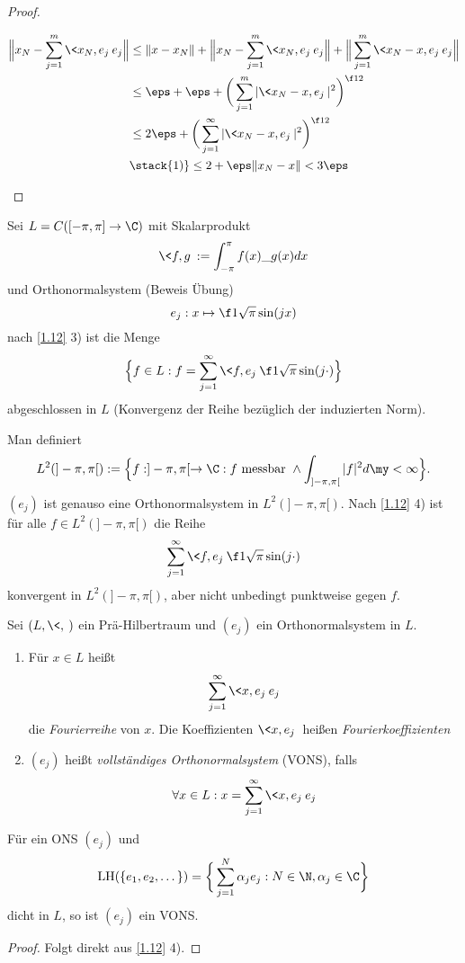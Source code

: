 \documentclass{mycourse}
\newcommand{\LH}{\operatorname{LH}}
\begin{document}
\begin{st}
\begin{proof}
\begin{enumerate}[1)]
\begin{align*}
					\Big\|x_N- \sum_{j=1}^m \<x_N,e_j\> e_j \Big\| 
					&\le \|x-x_N\| + \Big\|x_N - \sum_{j=1}^m \<x_N,e_j\> e_j \Big\| + \Big\| \sum_{j=1}^m \<x_N-x,e_j\> e_j \Big\|	\\
					&\le \eps + \eps + \bigg(\sum_{j=1}^m |\<x_N-x,e_j\>|^2 \bigg)^{\f 12} \\
					&\le 2\eps + \bigg(\sum_{j=1}^\infty |\<x_N-x,e_j\>|^2 \bigg)^{\f 12} \\
					&\stack{1)}\le 2 + \eps\|x_N-x\|
					< 3 \eps
				\end{align*}
		\end{enumerate}
	\end{proof}
\end{st}

\begin{ex} \label{1.13}
	Sei $L = C([-\pi,\pi] \to \C)$ mit Skalarprodukt
	\[
		\<f,g\> := \int_{-\pi}^{\pi}f(x)\_{g(x)} dx
	\]
	und Orthonormalsystem (Beweis Übung)
	\[
		e_j : x \mapsto \f 1{\sqrt{\pi}} \sin(jx)
	\]
	nach \ref{1.12} 3) ist die Menge
	\[
		\Big\{ f \in L : f = \sum_{j=1}^\infty \<f,e_j\> \f 1{\sqrt{\pi}}\sin(j \cdot) \Big\}
	\]
	abgeschlossen in $L$ (Konvergenz der Reihe bezüglich der induzierten Norm).

	Man definiert
	\[
		L^2(]-\pi,\pi[) := \Big\{ f: ]-\pi,\pi[ \to \C : f \text{ messbar } \land \int_{]-\pi,\pi[}|f|^2 d\my < \infty \Big\}.
	\]
	$(e_j)$ ist genauso eine Orthonormalsystem in $L^2(]-\pi,\pi[)$.
	Nach \ref{1.12} 4) ist für alle $f \in L^2(]-\pi,\pi[)$ die Reihe
	\[
		\sum_{j=1}^\infty \<f,e_j\> \f 1{\sqrt{\pi}} \sin(j \cdot)
	\]
	konvergent in $L^2(]-\pi,\pi[)$, aber nicht unbedingt punktweise gegen $f$.
\end{ex}

\begin{df} \label{1.14}
	Sei $(L, \<,\>)$ ein Prä-Hilbertraum und $(e_j)$ ein Orthonormalsystem in $L$.
	\begin{enumerate}[1)]
		\item
			Für $x\in L$ heißt
			\[
				\sum_{j=1}^\infty \<x,e_j\> e_j
			\]
			die \emph{Fourierreihe} von $x$.
			Die Koeffizienten $\<x,e_j\>$ heißen \emph{Fourierkoeffizienten}
		\item
			$(e_j)$ heißt \emph{vollständiges Orthonormalsystem} (VONS), falls
			\[
				\forall x \in L  : x = \sum_{j=1}^\infty \<x,e_j\> e_j
			\]
	\end{enumerate}
\end{df}

\begin{nt} \label{1.15}
	Für ein ONS $(e_j)$ und
	\[
		\LH(\{e_1,e_2,\dotsc\}) = \bigg\{ \sum_{j=1}^N \alpha_j e_j : N \in \N, \alpha_j \in \C \bigg\}
	\]
	dicht in $L$, so ist $(e_j)$ ein VONS.
	\begin{proof}
		Folgt direkt aus \ref{1.12} 4).
	\end{proof}
\end{nt}
\end{document}
